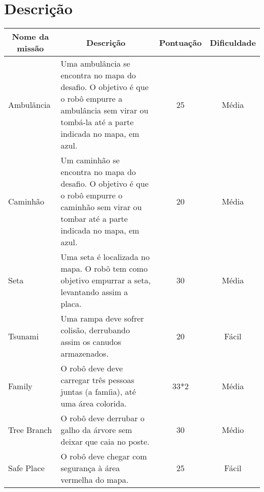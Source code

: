 \section{Descrição}

\begin{table}[h]
\begin{tabular}{|p{3.5cm}|p{7.5cm}|c|c|}
\hline
\multicolumn{1}{|c|}{\textbf{Nome da missão}} & \multicolumn{1}{c|}{\textbf{Descrição}}                                                                                                                  & \multicolumn{1}{c|}{\textbf{Pontuação}} & \multicolumn{1}{c|}{\textbf{Dificuldade}} \\ \hline
Ambulância                                    & Uma ambulância se encontra no mapa do desafio. O objetivo é que o robô empurre a ambulância sem virar ou tombá-la até a parte indicada no mapa, em azul. & 25                                      & Média                                     \\ \hline
Caminhão                                      & Um caminhão se encontra no mapa do desafio. O objetivo é que o robô empurre o caminhão sem virar ou tombar até a parte indicada no mapa, em azul.        & 20                                      & Média                                     \\ \hline
Seta                                          & Uma seta é localizada no mapa. O robô tem como objetivo empurrar a seta, levantando assim a placa.                                                       & 30                                      & Média                                     \\ \hline
Tsunami                                       & Uma rampa deve sofrer colisão, derrubando assim os canudos armazenados.                                                       & 20                                      & Fácil                                     \\ \hline
Family                                        & O robô deve deve carregar três pessoas juntas (a famíia), até uma área colorida. & 33*2 & Média                                    \\ \hline
Tree Branch                                   & O robô deve derrubar o galho da árvore sem deixar que caia no poste.                                        & 30        & Médio         \\ \hline
Safe Place                                    & O robô deve chegar com segurança à área vermelha do mapa.                                     & 25                                      & Fácil                                     \\ \hline

\end{tabular}
\end{table}
